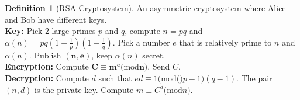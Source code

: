 \documentclass{article}
\renewcommand{\mod}[1]{\ensuremath{(\mathrm{mod}#1})}
\theoremstyle{definition}
\newtheorem*{defn}{Definition}
\theoremstyle{remark}
\begin{document}
{        \begin{defn}[RSA Cryptosystem]
            An asymmetric cryptosystem where Alice and Bob have different keys.\\
            \textbf{Key:} Pick 2 large primes $p$ and $q$, compute $n=pq$ and $\alpha(n)=pq(1-\frac{1}{p})(1-\frac{1}{q})$. Pick a number $e$ that is relatively prime to $n$ and $\alpha(n)$. Publish $\mathbf{(n,e)}$, keep $\alpha(n)$ secret.\\
            \textbf{Encryption:} Compute $\mathbf{C\equiv m^e\mod{n}}$. Send $C$.\\
            \textbf{Decryption:} Compute $d$ such that $ed\equiv 1\mod(p-1)(q-1)$. The pair $(n,d)$ is the private key. Compute $m\equiv C^d\mod{n}$.
        \end{defn}
    }
\end{document}

